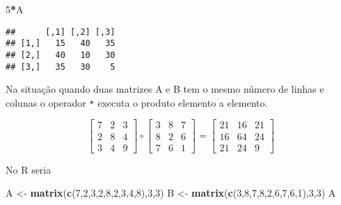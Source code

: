 \documentclass[
]{book}
\newenvironment{Shaded}{\begin{snugshade}}{\end{snugshade}}
\newcommand{\DecValTok}[1]{\textcolor[rgb]{0.00,0.00,0.81}{#1}}
\newcommand{\KeywordTok}[1]{\textcolor[rgb]{0.13,0.29,0.53}{\textbf{#1}}}
\newcommand{\NormalTok}[1]{#1}
\newcommand{\OperatorTok}[1]{\textcolor[rgb]{0.81,0.36,0.00}{\textbf{#1}}}
\newcommand{\StringTok}[1]{\textcolor[rgb]{0.31,0.60,0.02}{#1}}
\begin{document}
\begin{Shaded}
\begin{Highlighting}[]
\DecValTok{5}\OperatorTok{*}\NormalTok{A}
\end{Highlighting}
\end{Shaded}

\begin{verbatim}
##      [,1] [,2] [,3]
## [1,]   15   40   35
## [2,]   40   10   30
## [3,]   35   30    5
\end{verbatim}

Na situação quando duas matrizes A e B tem o mesmo número de linhas e colunas o operador \texttt{*} executa o produto elemento a elemento.

\begin{equation*}
\begin{bmatrix}
7 & 2 & 3\\
2 & 8 & 4\\
3 & 4 & 9
\end{bmatrix} \circ 
\begin{bmatrix}
3 & 8 & 7\\
8 & 2 & 6\\
7 & 6 & 1
\end{bmatrix} =
\begin{bmatrix}
21 & 16 & 21\\
16 & 64 & 24\\
21 & 24 & 9
\end{bmatrix}
\end{equation*}

No R seria

\begin{Shaded}
\begin{Highlighting}[]
\NormalTok{A \textless{}{-}}\StringTok{ }\KeywordTok{matrix}\NormalTok{(}\KeywordTok{c}\NormalTok{(}\DecValTok{7}\NormalTok{,}\DecValTok{2}\NormalTok{,}\DecValTok{3}\NormalTok{,}\DecValTok{2}\NormalTok{,}\DecValTok{8}\NormalTok{,}\DecValTok{2}\NormalTok{,}\DecValTok{3}\NormalTok{,}\DecValTok{4}\NormalTok{,}\DecValTok{8}\NormalTok{),}\DecValTok{3}\NormalTok{,}\DecValTok{3}\NormalTok{)}
\NormalTok{B \textless{}{-}}\StringTok{ }\KeywordTok{matrix}\NormalTok{(}\KeywordTok{c}\NormalTok{(}\DecValTok{3}\NormalTok{,}\DecValTok{8}\NormalTok{,}\DecValTok{7}\NormalTok{,}\DecValTok{8}\NormalTok{,}\DecValTok{2}\NormalTok{,}\DecValTok{6}\NormalTok{,}\DecValTok{7}\NormalTok{,}\DecValTok{6}\NormalTok{,}\DecValTok{1}\NormalTok{),}\DecValTok{3}\NormalTok{,}\DecValTok{3}\NormalTok{)}
\NormalTok{A}
\end{Highlighting}
\end{Shaded}
\end{document}
